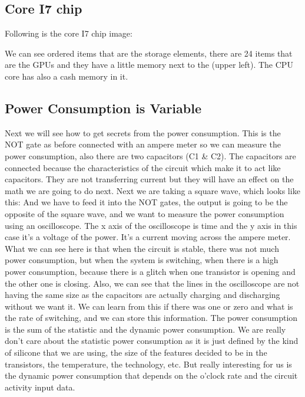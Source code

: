  \subsection { Core I7 chip }
Following is the core I7 chip image:

We can see ordered items that are the storage elements, there are 24 items that are the GPUs and they have a little memory next to the (upper left). The CPU core has also a cash memory in it.
\subsection { Power Consumption is Variable }
Next we will see how to get secrets from the power consumption.
This is the NOT gate as before connected with an ampere meter so we can measure the power consumption, also there are two capacitors (C1 & C2). The capacitors are connected because the characteristics of the circuit which make it to act like capacitors. They are not transferring current but they will have an effect on the math we are going to do next.
Next we are taking a square wave, which looks like this:
And we have to feed it into the NOT gates, the output is going to be the opposite of the square wave, and we want to measure the power consumption using an oscilloscope.
The x axis of the oscilloscope is time and the y axis in this case it's a voltage of the power. It's a current moving across the ampere meter. What we can see here is that when the circuit is stable, there was not much power consumption, but when the system is switching, when there is a high power consumption, because there is a glitch when one transistor is opening and the other one is closing.
Also, we can see that the lines in the oscilloscope are not having the same size as the capacitors are actually charging and discharging without we want it. We can learn from this if there was one or zero and what is the rate of switching, and we can store this information.
The power consumption is the sum of the statistic and the dynamic power consumption. 
We are really don’t care about the statistic power consumption as it is just defined by the kind of silicone that we are using, the size of the features decided to be in the transistors, the temperature, the technology, etc. But really interesting for us is the dynamic power consumption that depends on the o'clock rate and the circuit activity input data.
